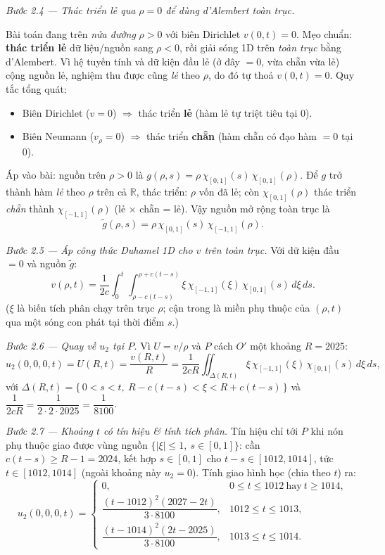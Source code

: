 \emph{Bước 2.4 --- Thác triển lẻ qua $\rho=0$ để dùng d'Alembert toàn trục.}
\begin{luuybox}
Bài toán đang trên \emph{nửa đường} $\rho>0$ với biên Dirichlet $v(0,t)=0$. Mẹo chuẩn: \textbf{thác triển lẻ} dữ liệu/nguồn sang $\rho<0$, rồi giải sóng 1D trên \emph{toàn trục} bằng d'Alembert. Vì hệ tuyến tính và dữ kiện đầu lẻ (ở đây $=0$, vừa chẵn vừa lẻ) cộng nguồn lẻ, nghiệm thu được cũng \emph{lẻ} theo $\rho$, do đó tự thoả $v(0,t)=0$. Quy tắc tổng quát:
\begin{itemize}
\item Biên Dirichlet ($v=0$) $\Rightarrow$ thác triển \textbf{lẻ} (hàm lẻ tự triệt tiêu tại $0$).
\item Biên Neumann ($v_\rho=0$) $\Rightarrow$ thác triển \textbf{chẵn} (hàm chẵn có đạo hàm $=0$ tại $0$).
\end{itemize}

Áp vào bài: nguồn trên $\rho>0$ là $g(\rho,s)=\rho\,\chi_{[0,1]}(s)\,\chi_{[0,1]}(\rho)$. Để $g$ trở thành hàm \emph{lẻ} theo $\rho$ trên cả $\mathbb{R}$, thác triển: $\rho$ vốn đã lẻ; còn $\chi_{[0,1]}(\rho)$ thác triển \emph{chẵn} thành $\chi_{[-1,1]}(\rho)$ (lẻ $\times$ chẵn = lẻ). Vậy nguồn mở rộng toàn trục là
\[
  \tilde g(\rho,s)=\rho\,\chi_{[0,1]}(s)\,\chi_{[-1,1]}(\rho).
\]
\end{luuybox}

\emph{Bước 2.5 --- Áp công thức Duhamel 1D cho $v$ trên toàn trục.} Với dữ kiện đầu $=0$ và nguồn $\tilde g$:
\[
  v(\rho,t)=\frac{1}{2c}\int_0^t\!\!\int_{\rho-c(t-s)}^{\rho+c(t-s)}\!\xi\,\chi_{[-1,1]}(\xi)\,\chi_{[0,1]}(s)\,d\xi\,ds.
\]
($\xi$ là biến tích phân chạy trên trục $\rho$; cận trong là miền phụ thuộc của $(\rho,t)$ qua một sóng con phát tại thời điểm $s$.)

\emph{Bước 2.6 --- Quay về $u_2$ tại $P$.} Vì $U=v/\rho$ và $P$ cách $O'$ một khoảng $R=2025$:
\[
  u_2(0,0,0,t)=U(R,t)=\frac{v(R,t)}{R}
  =\frac{1}{2cR}\iint_{\Delta(R,t)}\!\xi\,\chi_{[-1,1]}(\xi)\,\chi_{[0,1]}(s)\,d\xi\,ds,
\]
với $\Delta(R,t)=\{\,0<s<t,\ R-c(t-s)<\xi<R+c(t-s)\,\}$ và $\dfrac{1}{2cR}=\dfrac{1}{2\cdot2\cdot2025}=\dfrac{1}{8100}$.

\emph{Bước 2.7 --- Khoảng $t$ có tín hiệu \& tính tích phân.} Tín hiệu chỉ tới $P$ khi nón phụ thuộc giao được vùng nguồn $\{|\xi|\le1,\ s\in[0,1]\}$: cần $c(t-s)\ge R-1=2024$, kết hợp $s\in[0,1]$ cho $t-s\in[1012,1014]$, tức $t\in[1012,1014]$ (ngoài khoảng này $u_2=0$). Tính giao hình học (chia theo $t$) ra:
\[
  u_2(0,0,0,t)=\begin{cases}
    0,& 0\le t\le1012\ \text{hay}\ t\ge1014,\\[2pt]
    \dfrac{(t-1012)^2(2027-2t)}{3\cdot8100},& 1012\le t\le1013,\\[6pt]
    \dfrac{(t-1014)^2(2t-2025)}{3\cdot8100},& 1013\le t\le1014.
  \end{cases}
\]

